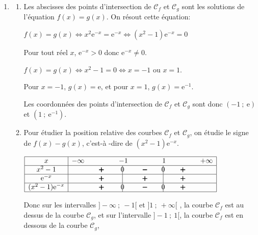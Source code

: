 \documentclass[10pt]{article}
\providecommand{\e}{{\mathrm{e}}}
\begin{document}
\begin{enumerate}
\item 
	\begin{enumerate}
		\item Les abscisses des points d'intersection de $\mathcal{C}_f$ et $\mathcal{C}_g$ sont les solutions de l'équation $f(x)=g(x)$. On résout cette équation:
		
$f(x)=g(x) \iff x^2\e^{-x}=\e^{-x}\iff (x^2-1)\e^{-x}=0$

Pour tout réel $x$, $\e^{-x}>0$ donc $\e^{-x}\neq 0$.

$f(x)=g(x) \iff x^2-1=0 \iff x=-1 \text{ ou } x=1$.

Pour $x=-1$, $g(x)=\e$, et pour $x=1$, $g(x)=\e^{-1}$.

Les coordonnées des points d'intersection de $\mathcal{C}_f$ et $\mathcal{C}_g$ sont donc $(-1~;~\e)$ et $(1~;~\e^{-1})$.
		
		\item Pour étudier la position relative des courbes $\mathcal{C}_f$ et $\mathcal{C}_g$, on étudie le signe de $f(x)-g(x)$, c'est-à -dire de $(x^2-1)\e^{-x}$.
		
\begin{center}
{
\renewcommand{\arraystretch}{1.5}
\def\esp{\hspace*{1cm}}
$\begin{array}{|c | *7{c} |} 
\hline
x  & -\infty & \esp & -1 & \esp & 1 & \esp & +\infty \\
\hline
x^2-1 &  & \pmb{+} &  \vline\hspace{-2.7pt}{0} & \pmb{-} & \vline\hspace{-2.7pt}{0} & \pmb{+} &\\
\hline
\e^{-x} &  & \pmb{+} &  \vline\hspace{-2.7pt}{\phantom 0} & \pmb{+} & \vline\hspace{-2.7pt}{\phantom 0} & \pmb{+} &\\
\hline
(x^2-1)\e^{-x} &  & \pmb{+} &  \vline\hspace{-2.7pt}{0} & \pmb{-} & \vline\hspace{-2.7pt}{0} & \pmb{+} &\\
\hline
\end{array}$
}
\end{center}		

Donc sur les intervalles $]-\infty~;~-1[$ et $]1~;~+\infty[$	, la courbe $\mathcal{C}_f$ est au dessus de la courbe $\mathcal{C}_g$,  et sur l'intervalle $]-1~;~1[$,	 la courbe $\mathcal{C}_f$ est en dessous de la courbe $\mathcal{C}_g$, 
		

\end{enumerate}
\end{enumerate}
\end{document}
